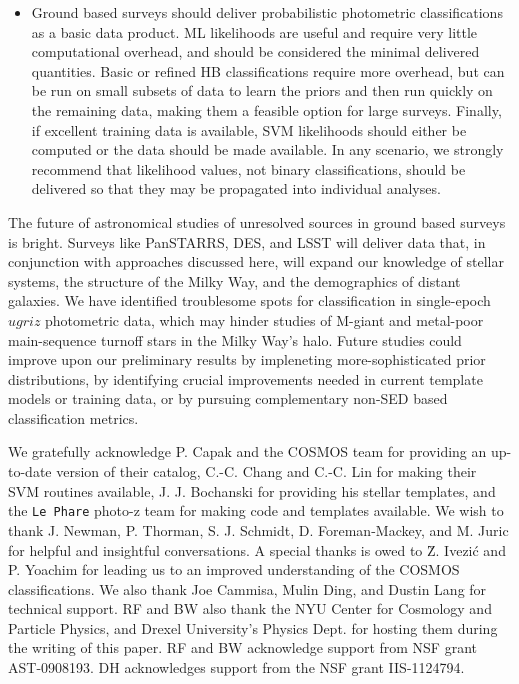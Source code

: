\documentclass[12pt,preprint]{aastex}
\begin{document}
\begin{itemize}
\item Ground based surveys should deliver probabilistic photometric 
 classifications as a basic data product.  ML likelihoods are useful and 
 require very little computational overhead, and should be considered the 
 minimal delivered quantities.  Basic or refined HB classifications require 
 more overhead, but can be run on small subsets of data to learn the 
 priors and then run quickly on the remaining data, making them a feasible 
 option for large surveys.  Finally, if excellent training 
 data is available, SVM likelihoods should either be computed or the data 
 should be made available.  In any scenario, we strongly recommend that 
 likelihood values, not binary classifications, should be delivered so that 
 they may be propagated into individual analyses.

\end{itemize}

The future of astronomical studies of unresolved sources in ground
based surveys is bright.  Surveys like PanSTARRS, DES, and LSST will
deliver data that, in conjunction with approaches discussed here, will
expand our knowledge of stellar systems, the structure of the Milky
Way, and the demographics of distant galaxies.  We have identified
troublesome spots for classification in single-epoch $ugriz$
photometric data, which may hinder studies of M-giant and metal-poor
main-sequence turnoff stars in the Milky Way's halo.  Future studies
could improve upon our preliminary results by impleneting
more-sophisticated prior distributions, by identifying crucial
improvements needed in current template models or training data, or by
pursuing complementary non-SED based classification metrics.

\acknowledgments

We gratefully acknowledge P. Capak and the COSMOS team for providing
an up-to-date version of their catalog, C.-C. Chang and C.-C. Lin for
making their SVM routines available, J. J. Bochanski for providing his 
stellar templates, and the {\tt Le Phare} photo-z
team for making code and templates available.  We wish to thank J.
Newman, P. Thorman, S. J. Schmidt, D. Foreman-Mackey, and M. Juric 
for helpful and insightful conversations.  A special thanks is owed to 
\u{Z}. Ivezi\'{c} and P. Yoachim for leading us to an improved understanding 
of the COSMOS classifications.  We also thank Joe Cammisa, Mulin 
Ding, and Dustin Lang for technical support.  RF and BW also thank 
the NYU Center for Cosmology and Particle Physics, and 
Drexel University's Physics Dept. for hosting them during the writing of 
this paper.  RF and BW acknowledge support from NSF grant 
AST-0908193.  DH acknowledges support from the NSF grant IIS-1124794.
\end{document}
